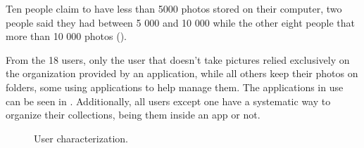 Ten people claim to have less than 5000 photos stored on their computer, two people said they had between 5 000 and 10 000 while the other eight people that more than 10 000 photos ().

From the 18 users, only the user that doesn't take pictures relied exclusively on the organization provided by an application, while all others keep their photos on folders, some using applications to help manage them. The applications in use can be seen in . Additionally, all users except one have a systematic way to organize their collections, being them inside an app or not.

\begin{figure}[!htb]
  \begin{subfigmatrix}{3}
  \end{subfigmatrix}
  \caption{User characterization.}
  \label{fig:linear}
\end{figure}




